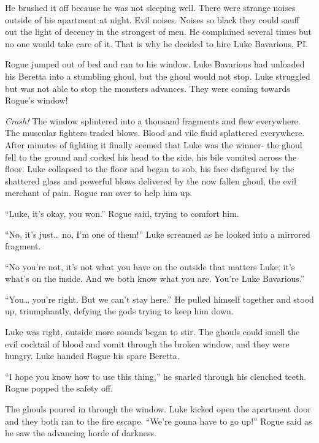 He brushed it off because he was not sleeping well. There were
strange noises outside of his apartment at night. Evil noises.
Noises so black they could snuff out the light of decency in the
strongest of men. He complained several times but no one would take
care of it. That is why he decided to hire Luke Bavarious,
PI.



Rogue jumped out of bed and ran to his window. Luke Bavarious had
unloaded his Beretta into a stumbling ghoul, but the ghoul would
not stop. Luke struggled but was not able to stop the monsters
advances. They were coming towards Rogue's window!



{\em Crash!} The window splintered into a thousand fragments and
flew everywhere. The muscular fighters traded blows. Blood and vile
fluid splattered everywhere. After minutes of fighting it finally
seemed that Luke was the winner- the ghoul fell to the ground and
cocked his head to the side, his bile vomited across the floor.
Luke collapsed to the floor and began to sob, his face disfigured
by the shattered glass and powerful blows delivered by the now
fallen ghoul, the evil merchant of pain. Rogue ran over to help him
up.



``Luke, it's okay, you won.'' Rogue said, trying to
comfort him.

``No, it's just{\ldots} no, I'm one of
them!'' Luke screamed as he looked into a mirrored
fragment.

``No you're not, it's not what you have on the
outside that matters Luke; it's what's on the inside.
And we both know what you are. You're Luke
Bavarious.''

``You{\ldots} you're right. But we can't stay
here.'' He pulled himself together and stood up, triumphantly,
defying the gods trying to keep him down.



Luke was right, outside more sounds began to stir. The ghouls could
smell the evil cocktail of blood and vomit through the broken
window, and they were hungry. Luke handed Rogue his spare
Beretta.



``I hope you know how to use this thing,'' he snarled
through his clenched teeth. Rogue popped the safety off.



The ghouls poured in through the window. Luke kicked open the
apartment door and they both ran to the fire escape.
``We're gonna have to go up!'' Rogue said as he saw
the advancing horde of darkness.



